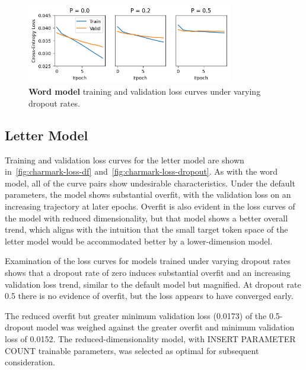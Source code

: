 \documentclass[letterpaper]{article} %
\begin{document}
\begin{NoHyper}
\begin{figure}
\centering
\includegraphics[width=0.8\textwidth]{fig-onemark-loss-dropout}
\caption{\textbf{Word model} training and validation loss curves under varying dropout rates.}
\label{fig:onemark-loss-dropout}
\end{figure}

\subsection{Letter Model}
\label{subsec:letter}

Training and validation loss curves for the letter model are shown in~\ref{fig:charmark-loss-df} and~\ref{fig:charmark-loss-dropout}.
As with the word model, all of the curve pairs show undesirable characteristics.
Under the default parameters, the model shows substantial overfit, with the validation loss on an increasing trajectory at later epochs.
Overfit is also evident in the loss curves of the model with reduced dimensionality, but that model shows a better overall trend, which aligns with the intuition that the small target token space of the letter model would be accommodated better by a lower-dimension model.

Examination of the loss curves for models trained under varying dropout rates shows that a dropout rate of zero induces substantial overfit and an increasing validation loss trend, similar to the default model but magnified.
At dropout rate 0.5 there is no evidence of overfit, but the loss appears to have converged early.

The reduced overfit but greater minimum validation loss (0.0173) of the 0.5-dropout model was weighed against the greater overfit and minimum validation loss of 0.0152.
The reduced-dimensionality model, with INSERT PARAMETER COUNT trainable parameters, was selected as optimal for subsequent consideration.


\end{NoHyper}
\end{document}
